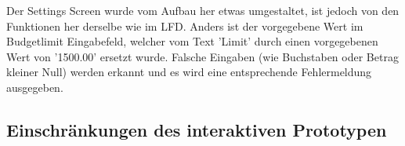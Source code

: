 \documentclass[a4paper,10pt]{article}
\begin{document}
Der Settings Screen wurde vom Aufbau her etwas umgestaltet, ist jedoch von den Funktionen her derselbe wie im LFD. Anders ist 
der vorgegebene Wert im Budgetlimit Eingabefeld, welcher vom Text 'Limit' durch einen vorgegebenen Wert von '1500.00' ersetzt
wurde. Falsche Eingaben (wie Buchstaben oder Betrag kleiner Null) werden erkannt und es wird eine entsprechende Fehlermeldung ausgegeben.


\clearpage
\subsection{Einschränkungen des interaktiven Prototypen}

\end{document}
